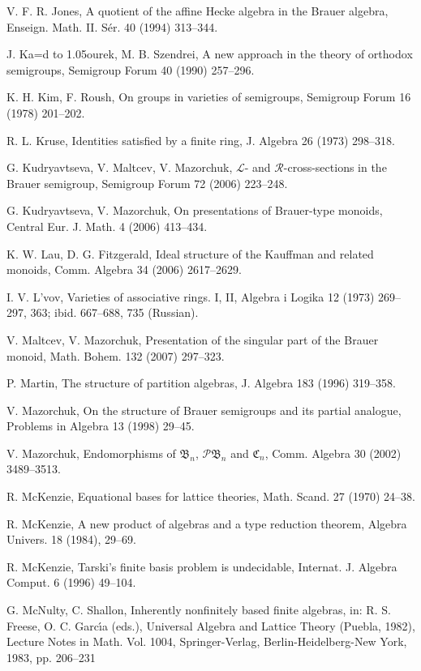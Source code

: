 \documentclass[preprint,1p,times]{elsarticle}
\numberwithin{equation}{section}
\theoremstyle{remark}
\def\softd{{\leavevmode\setbox1=\hbox{d}%
     \hbox to 1.05\wd1{d\kern-0.4ex{\char039}\hss}}}
\def\C{\mathfrak{C}}
\def\B{\mathfrak{B}}
\begin{document}
\begin{thebibliography}{99}
V. F. R. Jones, A quotient of the affine Hecke algebra in the Brauer algebra, Enseign. Math. II. S\'er. 40 (1994)
313--344.

J. {Ka\softd{}ourek}, M. B. Szendrei, A new approach in the theory of orthodox semigroups, Semigroup Forum 40 (1990)
257--296.

K. H. Kim, F. Roush, On groups in varieties of semigroups, Semigroup Forum 16 (1978) 201--202.

R. L. Kruse, Identities satisfied by a finite ring, J. Algebra 26 (1973) 298--318.

G. Kudryavtseva, V. Maltcev, V. Mazorchuk, ${\mathcal L}$- and $\mathcal R$-cross-sections in the Brauer semigroup,
Semigroup Forum 72 (2006) 223--248.

G. Kudryavtseva, V. Mazorchuk, On presentations of Brauer-type monoids, Central Eur. J. Math. 4 (2006) 413--434.

K. W. Lau, D. G. Fitzgerald, Ideal structure of the Kauffman and related monoids, Comm. Algebra 34 (2006) 2617--2629.

I. V. L'vov, Varieties of associative rings. I, II, Algebra i Logika 12 (1973) 269--297, 363; ibid. 667--688, 735
(Russian).

V. Maltcev, V. Mazorchuk, Presentation of the singular part of the Brauer monoid, Math. Bohem. 132 (2007) 297--323.

P. Martin, The structure of partition algebras, J. Algebra 183 (1996) 319--358.

V. Mazorchuk, On the structure of Brauer semigroups and its partial analogue, Problems in Algebra 13 (1998) 29--45.

V. Mazorchuk, Endomorphisms of $\B_n$, ${\mathcal P}\B_n$ and $\C_n$, Comm. Algebra 30 (2002) 3489--3513.

R. McKenzie, Equational bases for lattice theories,  Math. Scand. 27 (1970) 24--38.

R. McKenzie, A new product of algebras and a type reduction theorem, Algebra Univers. 18 (1984), 29--69.

R. McKenzie, Tarski's finite basis problem is undecidable, Internat. J. Algebra Comput. 6 (1996) 49--104.

G. McNulty, C. Shallon, Inherently nonfinitely based finite algebras, in: R. S. Freese, O. C. Garc\'{\i}a (eds.),
Universal Algebra and Lattice Theory (Puebla, 1982), Lecture Notes in Math. Vol. 1004, Springer-Verlag,
Berlin-Heidelberg-New York, 1983, pp. 206--231


\end{thebibliography}
\end{document}
